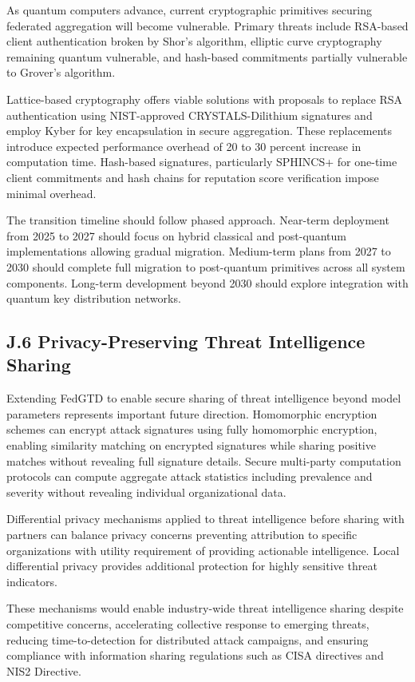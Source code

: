 \documentclass[12pt,a4paper]{article}
\theoremstyle{definition}
\begin{document}
As quantum computers advance, current cryptographic primitives securing federated aggregation will become vulnerable. Primary threats include RSA-based client authentication broken by Shor's algorithm, elliptic curve cryptography remaining quantum vulnerable, and hash-based commitments partially vulnerable to Grover's algorithm.

Lattice-based cryptography offers viable solutions with proposals to replace RSA authentication using NIST-approved CRYSTALS-Dilithium signatures and employ Kyber for key encapsulation in secure aggregation. These replacements introduce expected performance overhead of 20 to 30 percent increase in computation time. Hash-based signatures, particularly SPHINCS+ for one-time client commitments and hash chains for reputation score verification impose minimal overhead.

The transition timeline should follow phased approach. Near-term deployment from 2025 to 2027 should focus on hybrid classical and post-quantum implementations allowing gradual migration. Medium-term plans from 2027 to 2030 should complete full migration to post-quantum primitives across all system components. Long-term development beyond 2030 should explore integration with quantum key distribution networks.

\subsection{J.6 Privacy-Preserving Threat Intelligence Sharing}

Extending FedGTD to enable secure sharing of threat intelligence beyond model parameters represents important future direction. Homomorphic encryption schemes can encrypt attack signatures using fully homomorphic encryption, enabling similarity matching on encrypted signatures while sharing positive matches without revealing full signature details. Secure multi-party computation protocols can compute aggregate attack statistics including prevalence and severity without revealing individual organizational data.

Differential privacy mechanisms applied to threat intelligence before sharing with partners can balance privacy concerns preventing attribution to specific organizations with utility requirement of providing actionable intelligence. Local differential privacy provides additional protection for highly sensitive threat indicators.

These mechanisms would enable industry-wide threat intelligence sharing despite competitive concerns, accelerating collective response to emerging threats, reducing time-to-detection for distributed attack campaigns, and ensuring compliance with information sharing regulations such as CISA directives and NIS2 Directive.
\end{document}
